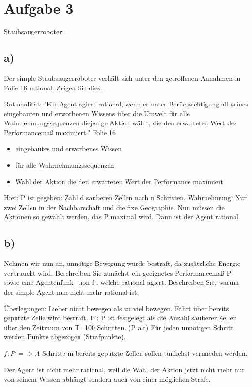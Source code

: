 \documentclass[10pt]{article}%
\theoremstyle{nonumberplain}
\begin{document}
\section{Aufgabe 3}
Staubsaugerroboter:
\subsection{a)}
Der simple Staubsaugerroboter verhält sich unter den getroffenen Annahmen in Folie 16
rational. Zeigen Sie dies.

Rationalität:
"Ein Agent agiert rational, wenn er unter Berücksichtigung all seines
eingebauten und erworbenen Wissens über die Umwelt für alle
Wahrnehmungssequenzen diejenige Aktion wählt, die den erwarteten
Wert des Performancemaß maximiert." Folie 16

\begin{itemize}
	\item eingebautes und erworbenes Wissen
	\item für alle Wahrnehmungssequenzen
	\item Wahl der Aktion die den erwarteten Wert der Performance maximiert
\end{itemize}

Hier: P ist gegeben: Zahl d sauberen Zellen nach n Schritten.
Wahrnehmung: Nur zwei Zellen in der Nachbarschaft und die fixe Geographie.
Nun müssen die Aktionen so gewählt werden, das P maximal wird.
Dann ist der Agent rational.

\subsection{b)}
Nehmen wir nun an, unnötige Bewegung würde bestraft, da zusätzliche Energie verbraucht
wird. Beschreiben Sie zunächst ein geeignetes Performancemaß P sowie eine Agentenfunk-
tion f , welche rational agiert. Beschreiben Sie, warum der simple Agent nun nicht mehr
rational ist.

Überlegungen:
Lieber nicht bewegen als zu viel bewegen.
Fahrt über bereits geputzte Zelle wird bestraft.
P':
P ist festgelegt als die Anzahl sauberer Zellen über den Zeitraum von T=100 Schritten. (P alt)
Für jeden unnötigen Schritt werden Punkte abgezogen (Strafpunkte).

$f: P' => A$
Schritte in bereits geputzte Zellen sollen tunlichst vermieden werden.

Der Agent ist nicht mehr rational, weil die Wahl der Aktion jetzt nicht mehr nur von seinem Wissen abhängt sondern auch von einer möglichen Strafe.
\end{document}
